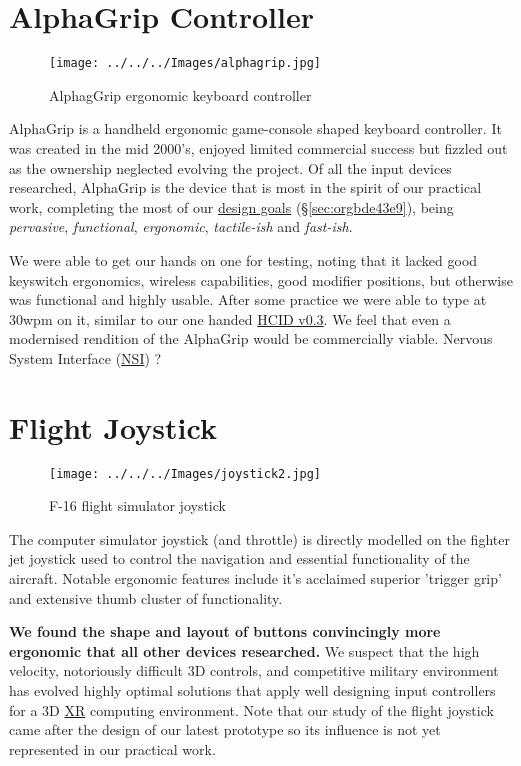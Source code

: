 \documentclass[logo,bsc,singlespacing,parskip]{infthesis}
\begin{document}
\chapter{AlphaGrip Controller}
\label{sec:org18e4c2f}
\begin{figure}[h]
\centering
\texttt{[image: ../../../Images/alphagrip.jpg]}
\caption{AlphagGrip ergonomic keyboard controller}
\end{figure}

AlphaGrip is a handheld ergonomic game-console shaped keyboard controller.
It was created in the mid 2000's, enjoyed limited commercial success but fizzled out as the ownership neglected evolving the project.
Of all the input devices researched, AlphaGrip is the device that is most in the spirit of our practical work, completing the most of our \hyperref[sec:orgbde43e9]{design goals} (\S \ref{sec:orgbde43e9}), being \emph{pervasive}, \emph{functional}, \emph{ergonomic}, \emph{tactile-ish} and \emph{fast-ish}.

We were able to get our hands on one for testing, noting that it lacked good keyswitch ergonomics, wireless capabilities, good modifier positions, but otherwise was functional and highly usable.
After some practice we were able to type at 30wpm on it, similar to our one handed \hyperref[sec:orgd7e9134]{HCID v0.3}.
We feel that even a modernised rendition of the AlphaGrip would be commercially viable.
Nervous System Interface (\hyperref[org79fc546]{NSI}) ?
\chapter{Flight Joystick}
\label{sec:orgf2689f0}
\begin{figure}[h]
\centering
\texttt{[image: ../../../Images/joystick2.jpg]}
\caption{F-16 flight simulator joystick}
\end{figure}

The computer simulator joystick (and throttle) is directly modelled on the fighter jet joystick used to control the navigation and essential functionality of the aircraft.
Notable ergonomic features include it's acclaimed superior 'trigger grip' and extensive thumb cluster of functionality.

\textbf{We found the shape and  layout of buttons convincingly more ergonomic that all other devices researched.}
We suspect that the high velocity, notoriously difficult 3D controls, and competitive military environment has evolved highly optimal solutions that apply well designing input controllers for a 3D \hyperref[org1d567af]{XR} computing environment.
Note that our study of the flight joystick came after the design of our latest prototype so its influence is not yet represented in our practical work.
\end{document}
